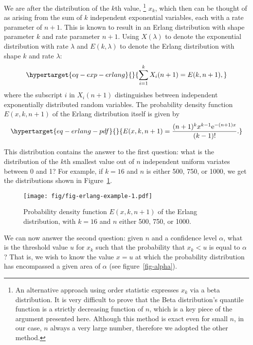 We are after the distribution of the $k$th value,
%
\footnote{An alternative approach using order statistic  expresses $x_k$ via a beta distribution. It is very difficult to prove  that the Beta distribution's quantile function is a strictly decreasing function of $n$, which is a key piece of the argument presented here. Although this method is exact even for small $n$, in our case, $n$ always a very large number, therefore we adopted the other method.} 
%
$x_k$, which then
can be thought of as arising from the sum of $k$ independent
exponential variables, each with a rate parameter of $n+1$. This is
known to result in an Erlang distribution with shape parameter $k$ and
rate parameter $n+1$. Using $X(\lambda)$ to denote the exponential
distribution with rate $\lambda$ and $E(k,\lambda)$ to denote the
Erlang distribution with shape $k$ and rate $\lambda$:
\begin{equation}\protect\hypertarget{eq-exp-erlang}{}{
\sum_{i=1}^k X_i(n+1)
= E(k,n+1) ,
}\label{eq-exp-erlang}\end{equation} where the subscript $i$ in
$X_i(n+1)$ distinguishes between independent exponentially distributed
random variables. The probability density function $E(x, k,n+1)$ of
the Erlang distribution itself is given by
\begin{equation}\protect\hypertarget{eq-erlang-pdf}{}{
E(x, k, n+1)
= \frac{(n+1)^k x^{k-1} \text{e}^{-(n+1)x}}{(k-1)!} .
}\label{eq-erlang-pdf}\end{equation}

This distribution contains the answer to the first question: what is the
distribution of the $k$th smallest value out of $n$ independent
uniform variates between 0 and 1? For example, if $k=16$ and $n$ is
either 500, 750, or 1000, we get the distributions shown in
Figure~\ref{fig-erlang-example}.

\begin{figure}[!ht]
  \centering
  \texttt{[image: fig/fig-erlang-example-1.pdf]}
  \caption[Probability density function of the Erlang distribution]{Probability density function $E(x, k, n+1)$ of the Erlang distribution, with $k=16$ and $n$ either 500, 750, or 1000.}
  \label{fig-erlang-example}
\end{figure}

We can now answer the second question: given $n$ and a confidence
level $\alpha$, what is the threshold value $u$ for $x_k$ such
that the probability that $x_k < u$ is equal to $\alpha$? That is,
we wish to know the value $x = u$ at which the probability
distribution has encompassed a given area of $\alpha$ (see figure~\ref{fig-alpha}).

